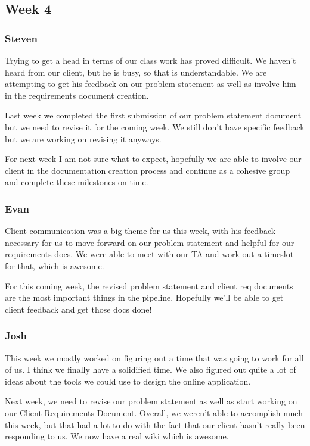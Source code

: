 \documentclass[onecolumn, draftclsnofoot,10pt, compsoc]{IEEEtran}
\begin{document}
\subsection{Week 4}
\subsubsection{Steven}

Trying to get a head in terms of our class work has proved difficult. We haven't heard from our client, but he is busy, so that is understandable. We are attempting to get his feedback on our problem statement as well as involve him in the requirements document creation.

Last week we completed the first submission of our problem statement document but we need to revise it for the coming week. We still don't have specific feedback but we are working on revising it anyways.

For next week I am not sure what to expect, hopefully we are able to involve our client in the documentation creation process and continue as a cohesive group and complete these milestones on time.

\subsubsection{Evan}

Client communication was a big theme for us this week, with his feedback necessary for us to move forward on our problem statement and helpful for our requirements docs. We were able to meet with our TA and work out a timeslot for that, which is awesome.

For this coming week, the revised problem statement and client req documents are the most important things in the pipeline. Hopefully we'll be able to get client feedback and get those docs done! 

\subsubsection{Josh}

This week we mostly worked on figuring out a time that was going to work for all of us. I think we finally have a solidified time. We also figured out quite a lot of ideas about the tools we could use to design the online application. 

Next week, we need to revise our problem statement as well as start working on our Client Requirements Document. Overall, we weren't able to accomplish much this week, but that had a lot to do with the fact that our client hasn't really been responding to us. We now have a real wiki which is awesome.
\end{document}
